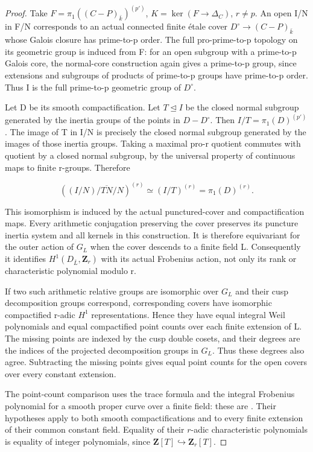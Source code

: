 \documentclass[11pt,a4paper]{article}
\begin{document}
\begin{proof}

Take \(F=\pi_1((C-P)_{\bar k})^{(p')}\), \(K=\ker(F\to\Delta_C)\), \(r{\ne}p\). An open I/N in F/N corresponds to an actual connected finite étale cover \(D^\circ\to(C-P)_{\bar k}\) whose Galois closure has prime-to-p order. The full pro-prime-to-p topology on its geometric group is induced from F: for an open subgroup with a prime-to-p Galois core, the normal-core construction again gives a prime-to-p group, since extensions and subgroups of products of prime-to-p groups have prime-to-p order. Thus I is the full prime-to-p geometric group of \(D^{\circ}\).

Let D be its smooth compactification. Let \(T{\trianglelefteq}I\) be the closed normal subgroup generated by the inertia groups of the points in \(D-D^{\circ}\). Then \(I/T=\pi_1(D)^{(p')}\). The image of T in I/N is precisely the closed normal subgroup generated by the images of those inertia groups. Taking a maximal pro-r quotient commutes with quotient by a closed normal subgroup, by the universal property of continuous maps to finite r-groups. Therefore

\[
 ((I/N)/\overline{TN}/N)^{(r)}
 \simeq (I/T)^{(r)}
 =\pi_1(D)^{(r)}.
\]

This isomorphism is induced by the actual punctured-cover and compactification maps. Every arithmetic conjugation preserving the cover preserves its puncture inertia system and all kernels in this construction. It is therefore equivariant for the outer action of \(G_L\) when the cover descends to a finite field L. Consequently it identifies \(H^1(D_{\bar L},\mathbf Z_r)\) with its actual Frobenius action, not only its rank or characteristic polynomial modulo r.

If two such arithmetic relative groups are isomorphic over \(G_L\) and their cusp decomposition groups correspond, corresponding covers have isomorphic compactified r-adic \(H^1\) representations. Hence they have equal integral Weil polynomials and equal compactified point counts over each finite extension of L. The missing points are indexed by the cusp double cosets, and their degrees are the indices of the projected decomposition groups in \(G_L\). Thus these degrees also agree. Subtracting the missing points gives equal point counts for the open covers over every constant extension.

The point-count comparison uses the trace formula and the integral
Frobenius polynomial for a smooth proper curve over a finite field:
these are \cite[formula (1.5.1) and Theorem (1.6)]{WeilCurves}.
Their hypotheses apply to both smooth compactifications and to every
finite extension of their common constant field. Equality of their
\(r\)-adic characteristic polynomials is equality of integer polynomials,
since \(\mathbf Z[T]\hookrightarrow\mathbf Z_r[T]\).


\end{proof}
\end{document}
